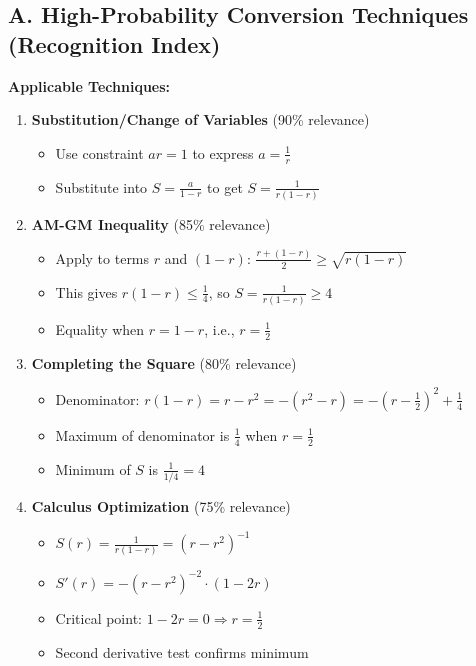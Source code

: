 \documentclass[12pt]{article}
\begin{document}
\begin{conversionbox}
\subsection*{A. High-Probability Conversion Techniques (Recognition Index)}

\textbf{Applicable Techniques:}

\begin{enumerate}[leftmargin=*]
    \item \textbf{Substitution/Change of Variables} (90\% relevance)
    \begin{itemize}
        \item Use constraint $ar = 1$ to express $a = \frac{1}{r}$
        \item Substitute into $S = \frac{a}{1-r}$ to get $S = \frac{1}{r(1-r)}$
    \end{itemize}
    
    \item \textbf{AM-GM Inequality} (85\% relevance)
    \begin{itemize}
        \item Apply to terms $r$ and $(1-r)$: $\frac{r + (1-r)}{2} \geq \sqrt{r(1-r)}$
        \item This gives $r(1-r) \leq \frac{1}{4}$, so $S = \frac{1}{r(1-r)} \geq 4$
        \item Equality when $r = 1-r$, i.e., $r = \frac{1}{2}$
    \end{itemize}
    
    \item \textbf{Completing the Square} (80\% relevance)
    \begin{itemize}
        \item Denominator: $r(1-r) = r - r^2 = -\left(r^2 - r\right) = -\left(r - \frac{1}{2}\right)^2 + \frac{1}{4}$
        \item Maximum of denominator is $\frac{1}{4}$ when $r = \frac{1}{2}$
        \item Minimum of $S$ is $\frac{1}{1/4} = 4$
    \end{itemize}
    
    \item \textbf{Calculus Optimization} (75\% relevance)
    \begin{itemize}
        \item $S(r) = \frac{1}{r(1-r)} = (r - r^2)^{-1}$
        \item $S'(r) = -(r-r^2)^{-2} \cdot (1-2r)$
        \item Critical point: $1-2r = 0 \Rightarrow r = \frac{1}{2}$
        \item Second derivative test confirms minimum
    \end{itemize}
\end{enumerate}


\end{conversionbox}
\end{document}
